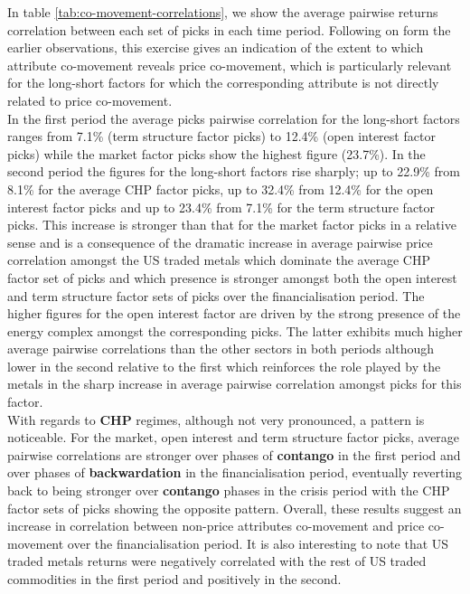 \documentclass[]{elsarticle} %
\begin{document}
In table \ref{tab:co-movement-correlations}, we show the average pairwise returns correlation between each set of picks in each time period. Following on form the earlier observations, this exercise gives an indication of the extent to which attribute co-movement reveals price co-movement, which is particularly relevant for the long-short factors for which the corresponding attribute is not directly related to price co-movement.\\
In the first period the average picks pairwise correlation for the long-short factors ranges from 7.1\% (term structure factor picks) to 12.4\% (open interest factor picks) while the market factor picks show the highest figure (23.7\%). In the second period the figures for the long-short factors rise sharply; up to 22.9\% from 8.1\% for the average CHP factor picks, up to 32.4\% from 12.4\% for the open interest factor picks and up to 23.4\% from 7.1\% for the term structure factor picks. This increase is stronger than that for the market factor picks in a relative sense and is a consequence of the dramatic increase in average pairwise price correlation amongst the US traded metals which dominate the average CHP factor set of picks and which presence is stronger amongst both the open interest and term structure factor sets of picks over the financialisation period. The higher figures for the open interest factor are driven by the strong presence of the energy complex amongst the corresponding picks. The latter exhibits much higher average pairwise correlations than the other sectors in both periods although lower in the second relative to the first which reinforces the role played by the metals in the sharp increase in average pairwise correlation amongst picks for this factor.\\
With regards to \textbf{CHP} regimes, although not very pronounced, a pattern is noticeable. For the market, open interest and term structure factor picks, average pairwise correlations are stronger over phases of \textbf{contango} in the first period and over phases of \textbf{backwardation} in the financialisation period, eventually reverting back to being stronger over \textbf{contango} phases in the crisis period with the CHP factor sets of picks showing the opposite pattern. Overall, these results suggest an increase in correlation between non-price attributes co-movement and price co-movement over the financialisation period. It is also interesting to note that US traded metals returns were negatively correlated with the rest of US traded commodities in the first period and positively in the second.
\end{document}
